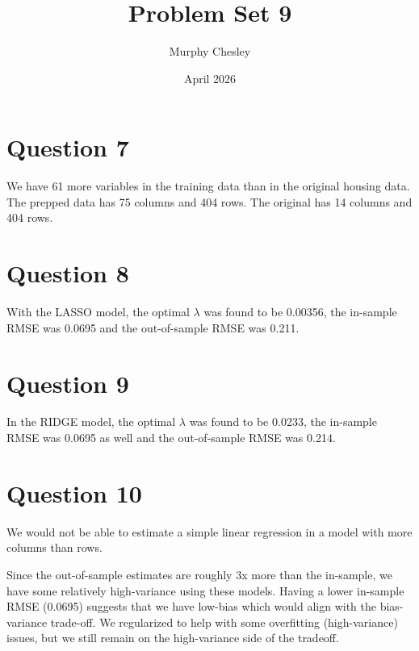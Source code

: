 \documentclass{article}
\title{Problem Set 9}
\author{Murphy Chesley}
\date{April 2026}
\begin{document}
\maketitle
\section{Question 7}
We have 61 more variables in the training data than in the original housing data. The prepped data has 75 columns and 404 rows. The original has 14 columns and 404 rows.

\section{Question 8}
With the LASSO model, the optimal $\lambda$ was found to be 0.00356, the in-sample RMSE was 0.0695 and the out-of-sample RMSE was 0.211.

\section{Question 9}
In the RIDGE model, the optimal $\lambda$ was found to be 0.0233, the in-sample RMSE was 0.0695 as well and the out-of-sample RMSE was 0.214. 

\section{Question 10}
We would not be able to estimate a simple linear regression in a model with more columns than rows.


Since the out-of-sample estimates are roughly 3x more than the in-sample, we have some relatively high-variance using these models. Having a lower in-sample RMSE (0.0695) suggests that we have low-bias which would align with the bias-variance trade-off. We regularized to help with some overfitting (high-variance) issues, but we still remain on the high-variance side of the tradeoff.
\end{document}
